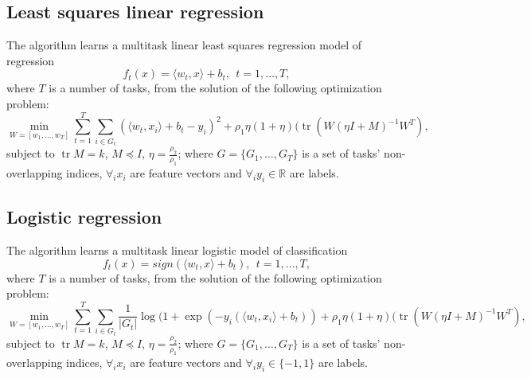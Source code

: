\subsection{Least squares linear regression}

The algorithm learns a multitask linear least squares regression model of regression 
$$
f_t(x) = \langle w_t,x \rangle + b_t, ~~ t = 1, \dots, T,
$$
where $T$ is a number of tasks, from the solution of the following optimization problem:
$$
\min_{W=\left[w_1, \dots, w_T\right]} \sum_{t=1}^{T} \sum_{i \in G_t} \left(\langle w_t,x_i \rangle + b_t - y_i\right)^2
+ \rho_1 \eta (1+\eta) (\mathop{\mathrm{tr}} (W (\eta I + M)^{-1} W^{T}),
$$
subject to $\mathop{\mathrm{tr}} M = k$, $M \preceq I$, $\eta = \frac{\rho_2}{\rho_1}$; where $G = \{ G_1, \dots, G_T \}$ 
is a set of tasks' non-overlapping indices, $\forall_i x_i$ are feature 
vectors and $\forall_i y_i \in \mathbb{R}$ are labels.

\subsection{Logistic regression}

The algorithm learns a multitask linear logistic model of classification 
$$
f_t(x) = sign (\langle w_t,x \rangle + b_t), ~~ t = 1, \dots, T,
$$
where $T$ is a number of tasks, from the solution of the following optimization problem:
$$
\min_{W=\left[w_1, \dots, w_T\right]} \sum_{t=1}^{T} \sum_{i \in G_t} \frac{1}{|G_t|} \log (1+\exp\left(-y_i(\langle w_t,x_i \rangle + b_t)\right)
+ \rho_1 \eta (1+\eta) (\mathop{\mathrm{tr}} (W (\eta I + M)^{-1} W^{T}),
$$
subject to $\mathop{\mathrm{tr}} M = k$, $M \preceq I$, $\eta = \frac{\rho_2}{\rho_1}$; where $G = \{ G_1, \dots, G_T \}$ 
is a set of tasks' non-overlapping indices, $\forall_i x_i$ are feature 
vectors and $\forall_i y_i \in \{-1,1\}$ are labels.



